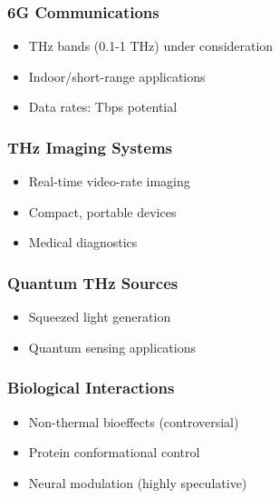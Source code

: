\subsubsection{6G Communications}\label{g-communications}

\begin{itemize}
\tightlist
\item
  THz bands (0.1-1 THz) under consideration
\item
  Indoor/short-range applications
\item
  Data rates: Tbps potential
\end{itemize}

\subsubsection{THz Imaging Systems}\label{thz-imaging-systems}

\begin{itemize}
\tightlist
\item
  Real-time video-rate imaging
\item
  Compact, portable devices
\item
  Medical diagnostics
\end{itemize}

\subsubsection{Quantum THz Sources}\label{quantum-thz-sources}

\begin{itemize}
\tightlist
\item
  Squeezed light generation
\item
  Quantum sensing applications
\end{itemize}

\subsubsection{\texorpdfstring{\textbf{Biological
Interactions}}{Biological Interactions}}\label{biological-interactions}

\begin{itemize}
\tightlist
\item
  Non-thermal bioeffects (controversial)
\item
  Protein conformational control
\item
  Neural modulation (highly speculative)
\end{itemize}


